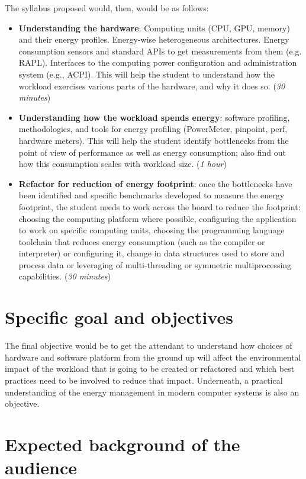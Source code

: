 \documentclass[a4paper]{article}
\begin{document}
 The syllabus proposed
would, then, would be as follows:\begin{itemize}
\item {\bf Understanding the hardware}: Computing units (CPU, GPU, memory) and
  their energy profiles. Energy-wise heterogeneous architectures. Energy
  consumption sensors and standard APIs to get measurements from them
  (e.g. RAPL). Interfaces to the computing power configuration and
  administration system (e.g., ACPI). This will help the student to understand
  how the workload exercises various parts of the hardware, and why it does
  so. ({\em 30 minutes})
\item {\bf Understanding how the workload spends energy}: software profiling,
  methodologies, and tools for energy profiling (PowerMeter, {\sf pinpoint},
  {\sf perf}, hardware meters). This will help the student identify bottlenecks
  from the point of view of performance as well as energy consumption; also find
  out how this consumption scales with workload size. ({\em 1 hour})
\item {\bf Refactor for reduction of energy footprint}: once the bottlenecks
  have been identified and specific benchmarks developed to measure the energy
  footprint, the student needs to work across the board to reduce the footprint:
  choosing the computing platform where possible, configuring the application to
  work on specific computing units, choosing the programming language toolchain
  that reduces energy consumption (such as the compiler or interpreter) or
  configuring it, change
  in data structures used to store and process data or leveraging of
  multi-threading or symmetric multiprocessing capabilities. ({\em 30 minutes})
\end{itemize}


\section{Specific goal and objectives}

The final objective would be to get the attendant to understand how choices of
hardware and software platform from the ground up will affect the environmental
impact of the workload that is going to be created or refactored and which best
practices need to be involved to reduce that impact. Underneath, a practical
understanding of the energy management in modern computer systems is also an
objective.

\section{Expected background of the audience}
\end{document}
